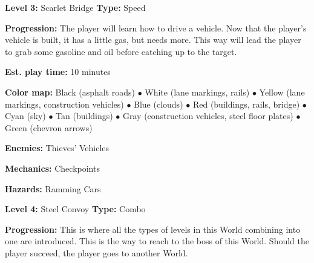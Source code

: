 \documentclass[12pt]{article}
\begin{document}
\begin{multicols}{2}
\noindent \textbf{Level 3:} Scarlet Bridge \newline
\indent \textbf{Type:} Speed
\begin{addmargin}[5mm]{0em}
\textbf{Progression:} The player will learn how to drive a vehicle. Now that the player's vehicle is built, it has a little gas, but needs more. This way will lead the player to grab some gasoline and oil before catching up to the target.
\end{addmargin}
\indent\indent \textbf{Est. play time:} 10 minutes
\begin{addmargin}[5mm]{0em}
\textbf{Color map:} Black (asphalt roads) $\bullet$ White (lane markings, rails) $\bullet$ Yellow (lane markings, construction vehicles) $\bullet$ Blue (clouds) $\bullet$ Red (buildings, rails, bridge) $\bullet$ Cyan (sky) $\bullet$ Tan (buildings) $\bullet$ Gray (construction vehicles, steel floor plates) $\bullet$ Green (chevron arrows)
\end{addmargin}
\begin{addmargin}[5mm]{0em}
\textbf{Enemies:} Thieves' Vehicles
\end{addmargin}
\begin{addmargin}[5mm]{0em}
\textbf{Mechanics:} Checkpoints
\end{addmargin}
\begin{addmargin}[5mm]{0em}
\textbf{Hazards:} Ramming Cars
\end{addmargin}

\columnbreak
\noindent \textbf{Level 4:} Steel Convoy \newline
\indent \textbf{Type:} Combo
\begin{addmargin}[5mm]{0em}
\textbf{Progression:} This is where all the types of levels in this World combining into one are introduced. This is the way to reach to the boss of this World. Should the player succeed, the player goes to another World.
\end{addmargin}

\end{multicols}
\end{document}

